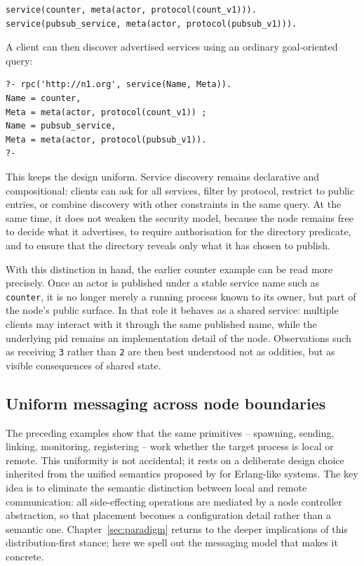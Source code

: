 \begin{verbatim}
service(counter, meta(actor, protocol(count_v1))).
service(pubsub_service, meta(actor, protocol(pubsub_v1))).
\end{verbatim}

\noindent A client can then discover advertised services using an
ordinary goal-oriented query:

\begin{verbatim}
?- rpc('http://n1.org', service(Name, Meta)).
Name = counter,
Meta = meta(actor, protocol(count_v1)) ;
Name = pubsub_service,
Meta = meta(actor, protocol(pubsub_v1)).
?-
\end{verbatim}

\noindent This keeps the design uniform. Service discovery remains
declarative and compositional: clients can ask for all services, filter
by protocol, restrict to public entries, or combine discovery with other
constraints in the same query. At the same time, it does not weaken the
security model, because the node remains free to decide what it
advertises, to require authorisation for the directory predicate, and to
ensure that the directory reveals only what it has chosen to publish.

\medskip
\noindent With this distinction in hand, the earlier counter example can
be read more precisely. Once an actor is published under a stable service
name such as \texttt{counter}, it is no longer merely a running process
known to its owner, but part of the node's public surface. In that role
it behaves as a shared service: multiple clients may interact with it
through the same published name, while the underlying pid remains an
implementation detail of the node. Observations such as receiving
\texttt{3} rather than \texttt{2} are then best understood not as
oddities, but as visible consequences of shared state.



\subsection{Uniform messaging across node boundaries}\label{sec:uniform-messaging}

The preceding examples show that the same primitives -- spawning,
sending, linking, monitoring, registering -- work whether the target
process is local or remote.  This uniformity is not accidental; it
rests on a deliberate design choice inherited from the unified
semantics proposed by \citet{conf/erlang/SvenssonFE10} for
Erlang-like systems.  The key idea is to eliminate the semantic
distinction between local and remote communication: all
side-effecting operations are mediated by a node controller
abstraction, so that placement becomes a configuration detail rather
than a semantic one. Chapter~\ref{sec:paradigm} returns to the deeper implications of this distribution-first stance; here we spell out the messaging
model that makes it concrete.


